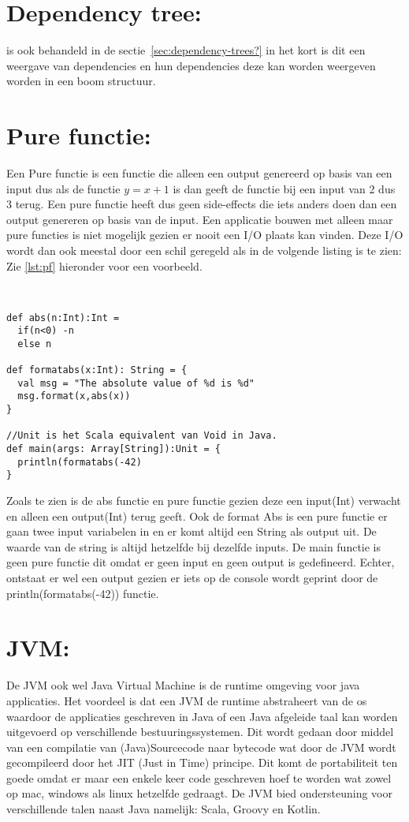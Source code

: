 \section{Dependency tree:}\label{sec:dependency-tree:} is ook behandeld in de sectie~\ref{sec:dependency-trees?} in het kort is dit een weergave van dependencies en hun dependencies deze kan worden weergeven worden in een boom structuur.
\smallskip

\section{Pure functie:}\label{sec:pure-functie:}
Een Pure functie is een functie die alleen een output genereerd op basis van een input dus als de functie \( y = x+1\) is dan geeft de functie bij een input van 2 dus 3 terug.
Een pure functie heeft dus geen side-effects die iets anders doen dan een output genereren op basis van de input.
Een applicatie bouwen met alleen maar pure functies is niet mogelijk gezien er nooit een I/O plaats kan vinden.
Deze I/O wordt dan ook meestal door een schil geregeld als in de volgende listing is te zien:
Zie \autoref{lst:pf} hieronder voor een voorbeeld.

\begin{lstlisting}[caption={Pure functie met IO},label=lst:pf]


def abs(n:Int):Int =
  if(n<0) -n
  else n

def formatabs(x:Int): String = {
  val msg = "The absolute value of %d is %d"
  msg.format(x,abs(x))
}

//Unit is het Scala equivalent van Void in Java.
def main(args: Array[String]):Unit = {
  println(formatabs(-42)
}
\end{lstlisting}

Zoals te zien is de abs functie en pure functie gezien deze een input(Int) verwacht en alleen een output(Int) terug geeft.
Ook de format Abs is een pure functie er gaan twee input variabelen in en er komt altijd een String als output uit.
De waarde van de string is altijd hetzelfde bij dezelfde inputs.
De main functie is geen pure functie dit omdat er geen input en geen output is gedefineerd.
Echter, ontstaat er wel een output gezien er iets op de console wordt geprint door de println(formatabs(-42)) functie.
\smallskip

\section{JVM:}\label{sec:jvm:}
De JVM ook wel Java Virtual Machine is de runtime omgeving voor java applicaties.
Het voordeel is dat een JVM de runtime abstraheert van de os waardoor de applicaties geschreven in Java of een Java afgeleide taal kan worden uitgevoerd op verschillende bestuuringssystemen.
Dit wordt gedaan door middel van een compilatie van (Java)Sourcecode naar bytecode wat door de JVM wordt gecompileerd door het JIT (Just in Time) principe.
Dit komt de portabiliteit ten goede omdat er maar een enkele keer code geschreven hoef te worden wat zowel op mac, windows als linux hetzelfde gedraagt.
De JVM bied ondersteuning voor verschillende talen naast Java namelijk: Scala, Groovy en Kotlin.
\smallskip

